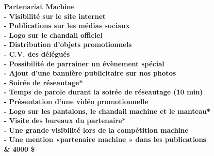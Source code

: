 \bf Partenariat Machine\\
- Visibilité sur le site internet\\
- Publications sur les médias sociaux\\
- Logo sur le chandail officiel\\
- Distribution d'objets promotionnels\\
- C.V. des délégués\\
- Possibilité de parrainer un évènement spécial\\
- Ajout d'une bannière publicitaire sur nos photos\\
- Soirée de réseautage*\\
- Temps de parole durant la soirée de réseautage (10 min)\\
- Présentation d'une vidéo promotionnelle\\
- Logo sur les pantalons, le chandail machine et le manteau*\\
- Visite des bureaux du partenaire*\\
- Une grande visibilité lors de la compétition machine\\
- Une mention «partenaire machine » dans les publications\\
& 4000 \$\\